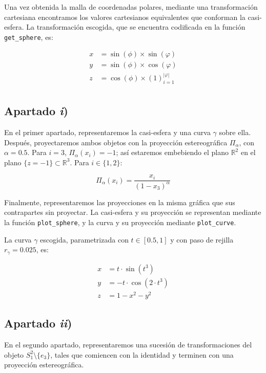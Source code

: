 \documentclass[a4paper]{article}
\begin{document}
	Una vez obtenida la malla de coordenadas polares, mediante una transformación cartesiana encontramos los valores cartesianos equivalentes que conforman la casi-esfera. La transformación escogida, que se encuentra codificada en la función \verb|get_sphere|, es:
	
	\[
	\begin{aligned}
	x &= \sin(\phi) \times \sin(\varphi)\\
	y &= \sin(\phi) \times \cos(\varphi)\\
	z &= \cos(\phi) \times (1)_{i=1}^{|\varphi|}\\
	\end{aligned}
	\]
	
	
	\subsection{Apartado \textit{i})}
	En el primer apartado, representaremos la casi-esfera y una curva $\gamma$ sobre ella. Después, proyectaremos ambos objetos con la proyección estereográfica $\Pi_\alpha$, con $\alpha=0.5$. Para $i=3$, $\Pi_\alpha(x_i) = -1$; así estaremos embebiendo el plano $\mathbb{R}^2$ en el plano $\{z=-1\}\subset\mathbb{R}^3$. Para $i\in\{1,2\}$:
	
	\[
	\Pi_\alpha(x_i) = \frac{x_i}{(1-x_3)^\alpha}
	\]
	
	Finalmente, representaremos las proyecciones en la misma gráfica que sus contrapartes sin proyectar. La casi-esfera y su proyección se representan mediante la función \verb|plot_sphere|, y la curva y su proyección mediante \verb|plot_curve|.
	
	La curva $\gamma$ escogida, parametrizada con $t\in[0.5,1]$ y con paso de rejilla $r_\gamma = 0.025$, es:
	
	\[
	\begin{aligned}
	x &= t\cdot\sin(t^3)\\
	y &= -t\cdot\cos(2\cdot t^3)\\
	z &= 1 - x^2 - y^2
	\end{aligned}
	\]
	
	\subsection{Apartado \textit{ii})}
	En el segundo apartado, representaremos una sucesión de transformaciones del objeto $S_1^2\setminus\{e_3\}$, tales que comiencen con la identidad y terminen con una proyección estereográfica. 
	
\end{document}
